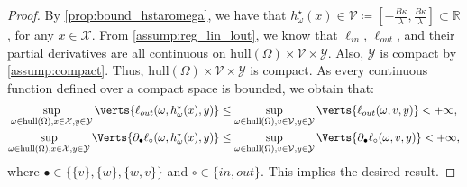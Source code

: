 \begin{proof}
By \cref{prop:bound_hstaromega}, we have that $h^\star_\omega(x)\in\mathcal{V}\coloneqq\left[-\frac{B\kappa}{\lambda},\frac{B\kappa}{\lambda}\right]\subset\mathbb{R}$, for any $x\in\mathcal{X}$. From \cref{assump:reg_lin_lout}, we know that $\ell_{in}$, $\ell_{out}$, and their partial derivatives are all continuous on $\text{hull}(\Omega)\times\mathcal{V}\times\mathcal{Y}$. Also, $\mathcal{Y}$ is compact by \cref{assump:compact}. Thus, $\text{hull}(\Omega)\times\mathcal{V}\times\mathcal{Y}$ is compact. As every continuous function defined over a compact space is bounded, we obtain that:
\begin{align*}
    \sup_{\omega\in\text{hull}(\Omega),x\in\mathcal{X},y\in\mathcal{Y}}\verts{\ell_{out}(\omega,h_{\omega}^{\star}(x),y)}&\leq\sup_{\omega\in\text{hull}(\Omega),v\in\mathcal{V},y\in\mathcal{Y}}\verts{\ell_{out}(\omega,v,y)}<+\infty,\\
    \sup_{\omega\in\text{hull}(\Omega),x\in\mathcal{X},y\in\mathcal{Y}}\Verts{\partial_{\bullet} \ell_{\circ}(\omega,h_{\omega}^{\star}(x),y)}&\leq\sup_{\omega\in\text{hull}(\Omega),v\in\mathcal{V},y\in\mathcal{Y}}\Verts{\partial_{\bullet} \ell_{\circ}(\omega,v,y)}<+\infty,
\end{align*}
where $\bullet \in \{\{v\}, \{w\}, \{w,v\}\}$ and $\circ \in \{in,out\}$. This implies the desired result.
\end{proof}

